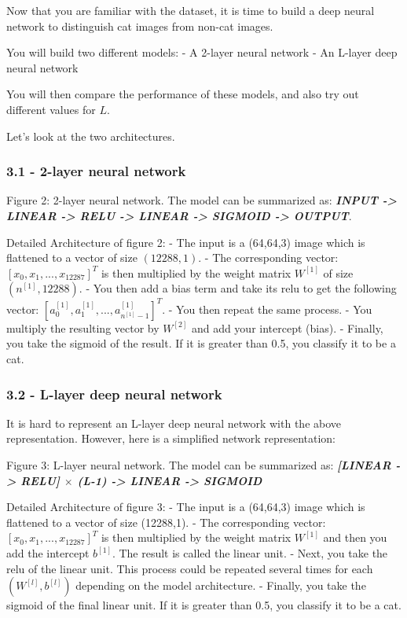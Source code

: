 \documentclass[11pt]{article}
\begin{document}
    Now that you are familiar with the dataset, it is time to build a deep
neural network to distinguish cat images from non-cat images.

You will build two different models: - A 2-layer neural network - An
L-layer deep neural network

You will then compare the performance of these models, and also try out
different values for \(L\).

Let's look at the two architectures.

\subsubsection{3.1 - 2-layer neural network}\label{layer-neural-network}

Figure 2: 2-layer neural network. The model can be summarized as:
\textbf{\emph{INPUT -\textgreater{} LINEAR -\textgreater{} RELU
-\textgreater{} LINEAR -\textgreater{} SIGMOID -\textgreater{} OUTPUT}}.

Detailed Architecture of figure 2: - The input is a (64,64,3) image
which is flattened to a vector of size \((12288,1)\). - The
corresponding vector: \([x_0,x_1,...,x_{12287}]^T\) is then multiplied
by the weight matrix \(W^{[1]}\) of size \((n^{[1]}, 12288)\). - You
then add a bias term and take its relu to get the following vector:
\([a_0^{[1]}, a_1^{[1]},..., a_{n^{[1]}-1}^{[1]}]^T\). - You then repeat
the same process. - You multiply the resulting vector by \(W^{[2]}\) and
add your intercept (bias). - Finally, you take the sigmoid of the
result. If it is greater than 0.5, you classify it to be a cat.

\subsubsection{3.2 - L-layer deep neural
network}\label{l-layer-deep-neural-network}

It is hard to represent an L-layer deep neural network with the above
representation. However, here is a simplified network representation:

Figure 3: L-layer neural network. The model can be summarized as:
\textbf{\emph{{[}LINEAR -\textgreater{} RELU{]} \(\times\) (L-1)
-\textgreater{} LINEAR -\textgreater{} SIGMOID}}

Detailed Architecture of figure 3: - The input is a (64,64,3) image
which is flattened to a vector of size (12288,1). - The corresponding
vector: \([x_0,x_1,...,x_{12287}]^T\) is then multiplied by the weight
matrix \(W^{[1]}\) and then you add the intercept \(b^{[1]}\). The
result is called the linear unit. - Next, you take the relu of the
linear unit. This process could be repeated several times for each
\((W^{[l]}, b^{[l]})\) depending on the model architecture. - Finally,
you take the sigmoid of the final linear unit. If it is greater than
0.5, you classify it to be a cat.
\end{document}
